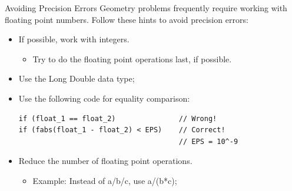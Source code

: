 \begin{frame}[fragile]{Avoiding Precision Errors}
  Geometry problems frequently require working with floating point numbers.
  Follow these hints to avoid precision errors:\bigskip

  \begin{itemize}
    \item If possible, work with integers.
    \begin{itemize}
      \item Try to do the floating point operations last, if possible.
    \end{itemize}
    \item Use the Long Double data type;
    \item Use the following code for equality comparison:
\begin{verbatim}
if (float_1 == float_2)               // Wrong!
if (fabs(float_1 - float_2) < EPS)    // Correct!
                                      // EPS = 10^-9
\end{verbatim}
    \item Reduce the number of floating point operations.
    \begin{itemize}
      \item Example: Instead of a/b/c, use a/(b*c);
    \end{itemize}
  \end{itemize}
\end{frame}

